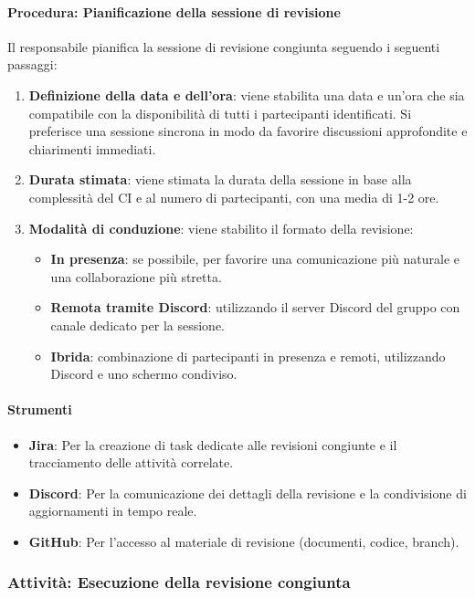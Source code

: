 \documentclass[a4paper,12pt]{article}
\begin{document}
\paragraph{Procedura: Pianificazione della sessione di revisione}
Il responsabile pianifica la sessione di revisione congiunta seguendo i
seguenti passaggi:
\begin{enumerate}
    \item \textbf{Definizione della data e dell'ora}: viene stabilita una data e un'ora che sia compatibile con la disponibilità di tutti i partecipanti identificati. Si preferisce una sessione sincrona in modo da favorire discussioni approfondite e chiarimenti immediati.
    \item \textbf{Durata stimata}: viene stimata la durata della sessione in base alla complessità del CI e al numero di partecipanti, con una media di 1-2 ore.
    \item \textbf{Modalità di conduzione}: viene stabilito il formato della revisione:
          \begin{itemize}
              \item \textbf{In presenza}: se possibile, per favorire una comunicazione più naturale e una collaborazione più stretta.
              \item \textbf{Remota tramite Discord}: utilizzando il server Discord del gruppo con canale dedicato per la sessione.
              \item \textbf{Ibrida}: combinazione di partecipanti in presenza e remoti, utilizzando Discord e uno schermo condiviso.
          \end{itemize}
\end{enumerate}

\paragraph{Strumenti}
\begin{itemize}
    \item \textbf{Jira}: Per la creazione di task dedicate alle revisioni congiunte e il tracciamento delle attività correlate.
    \item \textbf{Discord}: Per la comunicazione dei dettagli della revisione e la condivisione di aggiornamenti in tempo reale.
    \item \textbf{GitHub}: Per l'accesso al materiale di revisione (documenti, codice, branch).
\end{itemize}

\subsubsection{Attività: Esecuzione della revisione congiunta}
\end{document}
